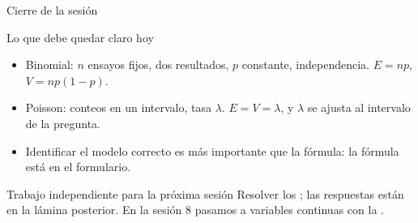 \documentclass[aspectratio=169,10pt]{beamer}
\begin{document}
\begin{frame}{Cierre de la sesión}
  \begin{block}{Lo que debe quedar claro hoy}
    \begin{itemize}
      \item Binomial: $n$ ensayos fijos, dos resultados, $p$ constante,
            independencia. $E=np$, $V=np(1-p)$.
      \item Poisson: conteos en un intervalo, tasa $\lambda$. $E=V=\lambda$, y
            $\lambda$ se ajusta al intervalo de la pregunta.
      \item Identificar el modelo correcto es más importante que la fórmula: la
            fórmula está en el formulario.
    \end{itemize}
  \end{block}

  \vspace{0.2cm}
  \begin{alertblock}{Trabajo independiente para la próxima sesión}
    \footnotesize
    Resolver los ; las
    respuestas están en la lámina posterior. En la sesión 8 pasamos a
    variables continuas con la .
  \end{alertblock}
\end{frame}
\end{document}
